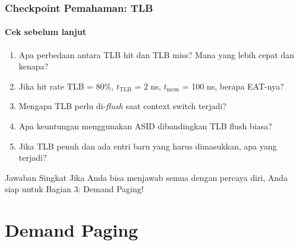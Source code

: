 \documentclass[t,aspectratio=169,xcolor=dvipsnames]{beamer}
\begin{document}
\begin{frame}
    \frametitle{Checkpoint Pemahaman: TLB}
    \framesubtitle{Cek sebelum lanjut}
    \small

    \begin{enumerate}
        \item Apa perbedaan antara TLB hit dan TLB miss? Mana yang lebih cepat dan kenapa?
        \vspace{0.1cm}
        \item Jika hit rate TLB = 80\%, $t_{\text{TLB}}$ = 2 ns, $t_{\text{mem}}$ = 100 ns, berapa EAT-nya?
        \vspace{0.1cm}
        \item Mengapa TLB perlu di-\textit{flush} saat context switch terjadi?
        \vspace{0.1cm}
        \item Apa keuntungan menggunakan ASID dibandingkan TLB flush biasa?
        \vspace{0.1cm}
        \item Jika TLB penuh dan ada entri baru yang harus dimasukkan, apa yang terjadi?
    \end{enumerate}

    \vspace{0.2cm}
    \begin{block}{Jawaban Singkat}
        Jika Anda bisa menjawab semua dengan percaya diri, Anda siap untuk Bagian 3: Demand Paging!
    \end{block}
\end{frame}

\section{Demand Paging}
\end{document}
